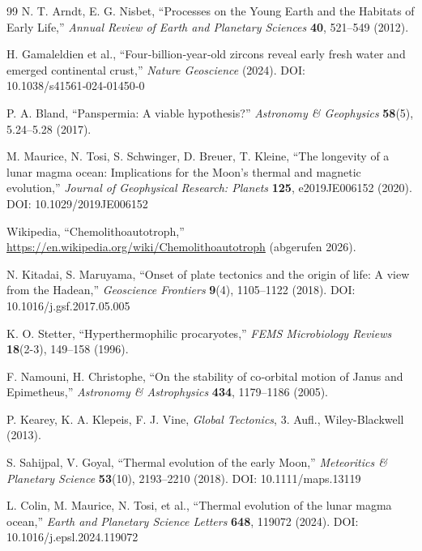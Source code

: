 \documentclass[11pt,a4paper]{article}
\begin{document}
\begin{thebibliography}{99}
		N. T. Arndt, E. G. Nisbet, ``Processes on the Young Earth and the Habitats of Early Life,''
		\emph{Annual Review of Earth and Planetary Sciences} \textbf{40}, 521–549 (2012).
		
		H. Gamaleldien et al., ``Four‑billion‑year‑old zircons reveal early fresh water and emerged continental crust,''
		\emph{Nature Geoscience} (2024). DOI: 10.1038/s41561‑024‑01450‑0
		
		
		P. A. Bland, ``Panspermia: A viable hypothesis?''
		\emph{Astronomy \& Geophysics} \textbf{58}(5), 5.24–5.28 (2017).
		
		M. Maurice, N. Tosi, S. Schwinger, D. Breuer, T. Kleine, ``The longevity of a lunar magma ocean: Implications for the Moon's thermal and magnetic evolution,''
		\emph{Journal of Geophysical Research: Planets} \textbf{125}, e2019JE006152 (2020). DOI: 10.1029/2019JE006152
		
		Wikipedia, ``Chemolithoautotroph,''
		\url{https://en.wikipedia.org/wiki/Chemolithoautotroph} (abgerufen 2026).
		
		N. Kitadai, S. Maruyama, ``Onset of plate tectonics and the origin of life: A view from the Hadean,''
		\emph{Geoscience Frontiers} \textbf{9}(4), 1105–1122 (2018). DOI: 10.1016/j.gsf.2017.05.005
		
		K. O. Stetter, ``Hyperthermophilic procaryotes,''
		\emph{FEMS Microbiology Reviews} \textbf{18}(2-3), 149–158 (1996).
		
		F. Namouni, H. Christophe, ``On the stability of co‑orbital motion of Janus and Epimetheus,''
		\emph{Astronomy \& Astrophysics} \textbf{434}, 1179–1186 (2005).
		
		P. Kearey, K. A. Klepeis, F. J. Vine, \emph{Global Tectonics}, 3. Aufl., Wiley-Blackwell (2013).
		
		S. Sahijpal, V. Goyal, ``Thermal evolution of the early Moon,''
		\emph{Meteoritics \& Planetary Science} \textbf{53}(10), 2193–2210 (2018).
		DOI: 10.1111/maps.13119
		
		L. Colin, M. Maurice, N. Tosi, et al., ``Thermal evolution of the lunar magma ocean,''
		\emph{Earth and Planetary Science Letters} \textbf{648}, 119072 (2024).
		DOI: 10.1016/j.epsl.2024.119072
		

\end{thebibliography}
\end{document}
